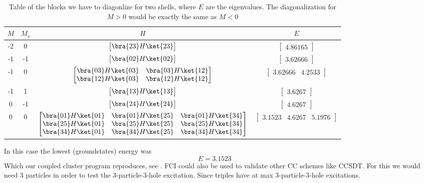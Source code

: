 \begin{table}[H]
\centering
\begin{tabular}{cccc}
\toprule
$M$ & $M_s$ & $H$ & $E$\\
\midrule
-2  & 0    &  $\begin{bmatrix}\bra{2 3}H\ket{2 3}\end{bmatrix}$   &  $\begin{bmatrix}4.86165\end{bmatrix}$ \\
-1  & -1   &  $\begin{bmatrix}\bra{0 2}H\ket{0 2}\end{bmatrix}$   &  $\begin{bmatrix}3.62666\end{bmatrix}$ \\
-1  & 0    &  $\begin{bmatrix}\bra{0 3}H\ket{0 3} & \bra{0 3}H\ket{1 2}\\\bra{1 2}H\ket{0 3} & \bra{1 2}H\ket{1 2}\end{bmatrix}$   &  $\begin{bmatrix}3.62666 & 4.2533\end{bmatrix}$  \\
-1  & 1    &  $\begin{bmatrix}\bra{1 3}H\ket{1 3}\end{bmatrix}$   &  $\begin{bmatrix}3.6267\end{bmatrix}$ \\
 0  & -1   &  $\begin{bmatrix}\bra{2 4}H\ket{2 4}\end{bmatrix}$   &  $\begin{bmatrix}4.6267\end{bmatrix}$  \\
 0  & 0    &  $\begin{bmatrix}\bra{0 1}H\ket{0 1} & \bra{0 1}H\ket{2 5} & \bra{0 1}H\ket{3 4}\\ \bra{2 5}H\ket{0 1} & \bra{2 5}H\ket{2 5} & \bra{2 5}H\ket{3 4}\\ \bra{3 4}H\ket{0 1} & \bra{3 4}H\ket{2 5} & \bra{3 4}H\ket{3 4}\end{bmatrix}$ &  $\begin{bmatrix}3.1523 & 4.6267 & 5.1976 \end{bmatrix}$ \\
\bottomrule
\end{tabular}
\caption{Table of the blocks we have to diagonlize for two shells, where $E$ are the eigenvalues. The diagonalization for $M>0$ would be exactly the same as $M<0$}
\end{table}
%
In this case the lowest (groundstates) energy was
\begin{equation}
E = 3.1523
  \label{groundstates}
\end{equation}
%
Which our coupled cluster program reproduces, see \cite{lohne}. FCI could also be used to validate other CC schemes like CCSDT. For this we would need 3 particles in order to test the 3-particle-3-hole excitation. Since triples have at max 3-particle-3-hole excitations. 

